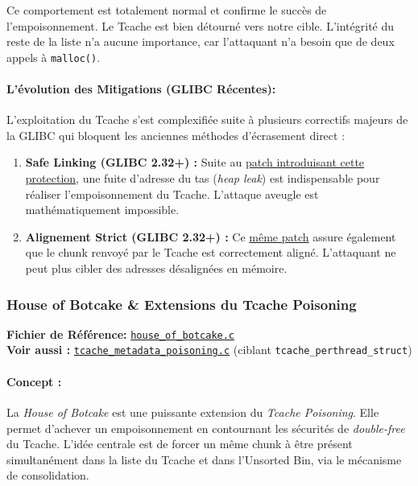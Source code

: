 Ce comportement est totalement normal et confirme le succès de l'empoisonnement. Le Tcache est bien détourné vers notre cible. L'intégrité du reste de la liste n'a aucune importance, car l'attaquant n'a besoin que de deux appels à \texttt{malloc()}.

\paragraph{L'évolution des Mitigations (GLIBC Récentes):}
L'exploitation du Tcache s'est complexifiée suite à plusieurs correctifs majeurs de la GLIBC qui bloquent les anciennes méthodes d'écrasement direct :
\begin{enumerate}
    \item \textbf{Safe Linking (GLIBC 2.32+) :} Suite au \href{https://sourceware.org/git/?p=glibc.git;a=commitdiff;h=a1a486d70ebcc47a686ff5846875eacad0940e41}{patch introduisant cette protection}, une fuite d'adresse du tas (\textit{heap leak}) est indispensable pour réaliser l'empoisonnement du Tcache. L'attaque aveugle est mathématiquement impossible.
    \item \textbf{Alignement Strict (GLIBC 2.32+) :} Ce \href{https://sourceware.org/git/?p=glibc.git;a=commitdiff;h=a1a486d70ebcc47a686ff5846875eacad0940e41}{même patch} assure également que le chunk renvoyé par le Tcache est correctement aligné. L'attaquant ne peut plus cibler des adresses désalignées en mémoire.
\end{enumerate}

\subsubsection{House of Botcake \& Extensions du Tcache Poisoning}

\noindent\textbf{Fichier de Référence:} \href{https://github.com/shellphish/how2heap/blob/master/glibc_2.41/house_of_botcake.c}{\texttt{house\_of\_botcake.c}}\\
\noindent\textbf{Voir aussi :} \href{https://github.com/shellphish/how2heap/blob/master/glibc_2.41/tcache_metadata_poisoning.c}{\texttt{tcache\_metadata\_poisoning.c}} (ciblant \texttt{tcache\_perthread\_struct})

\paragraph{Concept :}
La \textit{House of Botcake} est une puissante extension du \textit{Tcache Poisoning}. Elle permet d'achever un empoisonnement en contournant les sécurités de \textit{double-free} du Tcache. L'idée centrale est de forcer un même chunk à être présent simultanément dans la liste du Tcache et dans l'Unsorted Bin, via le mécanisme de consolidation.

